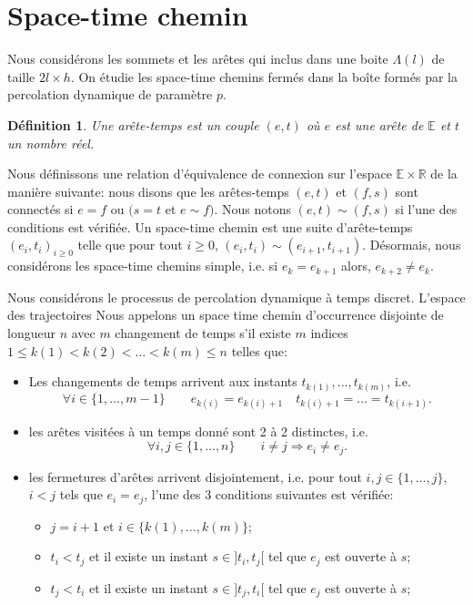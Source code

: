 \documentclass[titlepage,a4paper,12pt]{article}
\newcounter{def}
\newtheorem{pointTS}[def]{Définition}
\begin{document}
\section{Space-time chemin}
Nous considérons les sommets et les arêtes qui inclus dans une boite $\Lambda(l)$ de taille $2l\times h$. On étudie les space-time chemins fermés dans la boîte formés par la percolation dynamique de paramètre $p$.
\begin{pointTS}
Une arête-temps est un couple $(e,t)$ où $e$ est une arête de $\mathbb{E}$ et $t$ un nombre réel. 
\end{pointTS}

Nous définissons une relation d'équivalence de connexion sur l'espace $\mathbb{E}\times \mathbb{R}$ de la manière suivante: nous disons que les arêtes-temps $(e,t)$ et $(f,s)$ sont connectés si $e=f$ ou $(s=t$ et $e\sim f)$. Nous notons $(e,t)\sim(f,s)$ si l'une des conditions est vérifiée. Un space-time chemin est une suite d'arête-temps $(e_i,t_i)_{i\geqslant 0}$ telle que pour tout $i\geqslant 0$, $(e_i,t_i)\sim(e_{i+1},t_{i+1})$. Désormais, nous considérons les space-time chemins simple, i.e. si $e_k = e_{k+1}$ alors, $e_{k+2} \neq e_k$.

Nous considérons le processus de percolation dynamique à temps discret. L'espace des trajectoires 
Nous appelons un space time chemin d'occurrence disjointe de longueur $n$ avec $m$ changement de temps s'il existe $m$ indices $1\leqslant k(1)< k(2) < \dots < k(m) \leqslant n$ telles que:
\begin{itemize}[label = $\bullet$, leftmargin = *]
\item Les changements de temps arrivent aux instants $t_{k(1)},\dots, t_{k(m)}$, i.e.
$$\forall i\in \{1,\dots, m-1\} \qquad e_{k(i)} = e_{k(i)+1} \quad t_{k(i)+1} =\dots = t_{k(i+1)}.
$$
\item les arêtes visitées à un temps donné sont 2 à 2 distinctes, i.e.
$$ \forall i,j \in \{1,\dots, n\} \qquad i\neq j \Rightarrow e_i\neq e_j.
$$
\item les fermetures d'arêtes arrivent disjointement, i.e. pour tout $i,j\in \{1,\dots, j\}$, $i<j$ tels que $e_i = e_j$, l'une des 3 conditions suivantes est vérifiée:
\begin{itemize}
\item $j=i+1$ et $i\in \{k(1),\dots, k(m)\}$;
\item $t_i< t_j$ et il existe un instant $s\in ]t_i,t_j[$ tel que $e_j$ est ouverte à $s$;
\item $t_j< t_i$ et il existe un instant $s\in ]t_j,t_i[$ tel que $e_j$ est ouverte à $s$;
\end{itemize}
\end{itemize}
\end{document}
